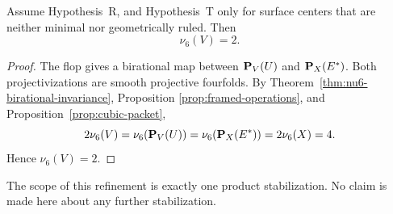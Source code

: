 \begin{corollary}
\label{cor:v14-framed-count}
%
Assume Hypothesis~R, and Hypothesis~T only for surface centers that are
neither minimal nor geometrically ruled.  Then
\[
  \nu_6(V)=2.
  \label{eq:v14-stabilization}
\]
\end{corollary}

\begin{proof}
The flop gives a birational map between \(\mathbf P_V(U)\) and
\(\mathbf P_X(E^*)\).  Both projectivizations are smooth
projective fourfolds.  By Theorem~\ref{thm:nu6-birational-invariance}, Proposition
\ref{prop:framed-operations}, and Proposition~\ref{prop:cubic-packet},
\[
  2\nu_6(V)=\nu_6(\mathbf P_V(U))
  =\nu_6(\mathbf P_X(E^*))=2\nu_6(X)=4.
\]
Hence \(\nu_6(V)=2\).
\end{proof}

The scope of this refinement is exactly one product stabilization.  No claim
is made here about any further stabilization.
